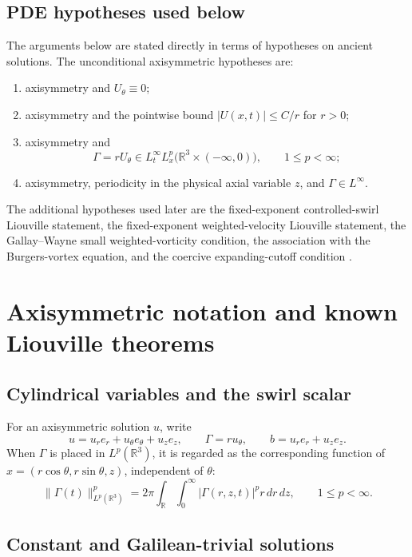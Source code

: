 \documentclass[11pt]{amsart}
\theoremstyle{plain}
\theoremstyle{definition}
\theoremstyle{remark}
\numberwithin{equation}{section}
\begin{document}
\subsection{PDE hypotheses used below}

The arguments below are stated directly in terms of hypotheses on ancient
solutions.  The unconditional axisymmetric hypotheses are:
\begin{enumerate}[label=\textup{(\roman*)}]
\item axisymmetry and \(U_\theta\equiv0\);
\item axisymmetry and the pointwise bound \(|U(x,t)|\le C/r\) for \(r>0\);
\item axisymmetry and
\[
   \Gamma=rU_\theta\in L_t^\infty L_x^p
   \bigl(\mathbb R^3\times(-\infty,0)\bigr),
   \qquad 1\le p<\infty;
\]
\item axisymmetry, periodicity in the physical axial variable \(z\), and
\(\Gamma\in L^\infty\).
\end{enumerate}
The additional hypotheses used later are the fixed-exponent controlled-swirl
Liouville statement, the fixed-exponent weighted-velocity Liouville statement,
the Gallay--Wayne small weighted-vorticity condition, the association with the
Burgers-vortex equation, and the coercive expanding-cutoff condition
.

\section{Axisymmetric notation and known Liouville theorems}
\label{sec:axisymmetric-liouville-theorems}

\subsection{Cylindrical variables and the swirl scalar}

For an axisymmetric solution \(u\), write
\[
   u=u_re_r+u_\theta e_\theta+u_ze_z,\qquad
   \Gamma=ru_\theta,\qquad
   b=u_re_r+u_ze_z .
\]
When \(\Gamma\) is placed in \(L^p(\mathbb R^3)\), it is regarded as the
corresponding function of \(x=(r\cos\theta,r\sin\theta,z)\), independent of
\(\theta\):
\[
   \|\Gamma(t)\|_{L^p(\mathbb R^3)}^p
   =
   2\pi\int_{\mathbb R}\int_0^\infty
      |\Gamma(r,z,t)|^p r\,dr\,dz,\qquad 1\le p<\infty .
\]

\subsection{Constant and Galilean-trivial solutions}
\end{document}
